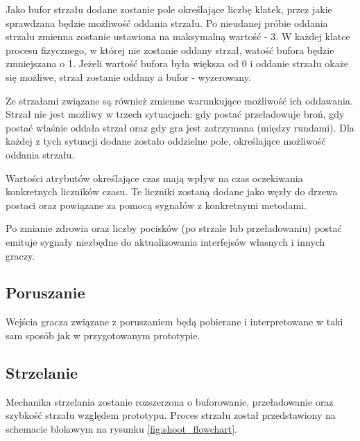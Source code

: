 Jako bufor strzału dodane zostanie pole określające liczbę klatek, przez jakie sprawdzana będzie możliwość oddania strzału. Po nieudanej próbie oddania strzału zmienna zostanie ustawiona na maksymalną wartość - 3. W każdej klatce procesu fizycznego, w której nie zostanie oddany strzał, watość bufora będzie zmniejszana o 1. Jeżeli wartość bufora była większa od 0 i oddanie strzału okaże się możliwe, strzał zostanie oddany a bufor - wyzerowany.

Ze strzałami związane są również zmienne warunkujące możliwość ich oddawania. Strzał nie jest możliwy w trzech sytuacjach: gdy postać przeładowuje broń, gdy postać właśnie oddała strzał oraz gdy gra jest zatrzymana (między rundami). Dla każdej z tych sytuacji dodane zostało oddzielne pole, określające możliwość oddania strzału.

Wartości atrybutów określające czas mają wpływ na czas oczekiwania konkretnych liczników czasu. Te liczniki zostaną dodane jako węzły do drzewa postaci oraz powiązane za pomocą sygnałów z konkretnymi metodami.

Po zmianie zdrowia oraz liczby pocisków (po strzale lub przeładowaniu) postać emituje sygnały niezbędne do aktualizowania interfejsów własnych i innych graczy.

\subsection{Poruszanie}
Wejścia gracza związane z poruszaniem będą pobierane i interpretowane w taki sam sposób jak w przygotowanym prototypie.

\subsection{Strzelanie}
Mechanika strzelania zostanie rozszerzona o buforowanie, przeładowanie oraz szybkość strzału względem prototypu. Proces strzału został przedstawiony na schemacie blokowym na rysunku \ref{fig:shoot_flowchart}.



